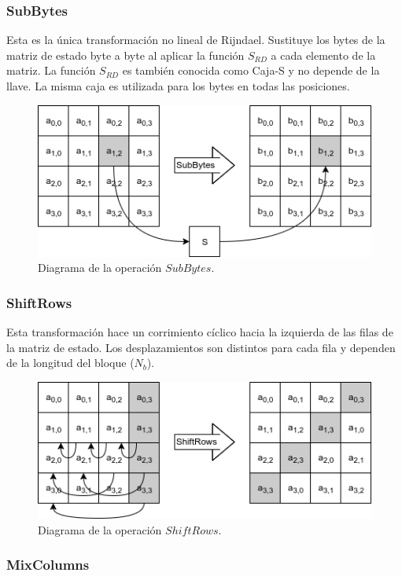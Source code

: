 \subsubsection{SubBytes}

Esta es la única transformación no lineal de Rijndael. Sustituye
los bytes de la matriz de estado byte a byte al aplicar la función
$S_{RD}$ a cada elemento de la matriz. La función $S_{RD}$ es también
conocida como Caja-S y no depende de la llave. La misma caja es utilizada
para los bytes en todas las posiciones.

\begin{figure}
  \begin{center}
    \includegraphics[width=0.6\linewidth]{diagramas/subBytes}
    \caption{Diagrama de la operación $SubBytes$.}
   \end{center}
\end{figure}


\subsubsection{ShiftRows}

Esta transformación hace un corrimiento cíclico hacia la izquierda de las
filas de la matriz de estado. Los desplazamientos son distintos para cada
fila y dependen de la longitud del bloque ($N_b$).

\begin{figure}
  \begin{center}
    \includegraphics[width=0.6\linewidth]{diagramas/shiftRows}
    \caption{Diagrama de la operación $ShiftRows$.}
   \end{center}
\end{figure}


\subsubsection{MixColumns}

